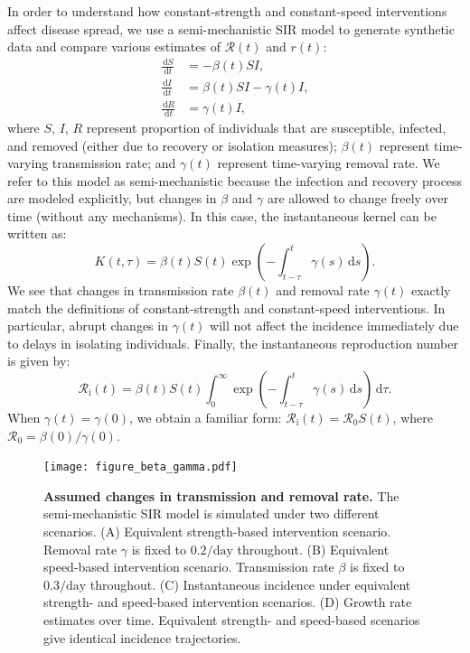 \documentclass[12pt]{article}
\newcommand{\pday}{\ensuremath{/\textrm{day}}}
\newcommand{\Rx}[1]{\ensuremath{{\mathcal R}_{#1}}\xspace}
\newcommand{\Ro}{\Rx{0}}
\newcommand{\Ri}{\Rx{\mathrm{i}}}
\newcommand{\RR}{\ensuremath{{\mathcal R}}\xspace}
\newcommand{\dd}[1]{\ensuremath{\, \mathrm{d}#1}}
\newcommand{\dtau}{\dd{\tau}}
\begin{document}
In order to understand how constant-strength and constant-speed interventions affect disease spread, we use a semi-mechanistic SIR model to generate synthetic data and compare various estimates of $\RR(t)$ and $r(t)$:
\begin{align}
\frac{\dd{S}}{\dd{t}} &= - \beta(t)S I, \label{eq:dSdt}\\
\frac{\dd{I}}{\dd{t}} &= \beta(t)S I - \gamma(t) I,\\
\frac{\dd{R}}{\dd{t}} &= \gamma(t) I,  \label{eq:dRdt}
\end{align}
where $S$, $I$, $R$ represent proportion of individuals that are susceptible, infected, and removed (either due to recovery or isolation measures);
$\beta(t)$ represent time-varying transmission rate; and $\gamma(t)$ represent time-varying removal rate.
We refer to this model as semi-mechanistic because the infection and recovery process are modeled explicitly, but changes in $\beta$ and $\gamma$ are allowed to change freely over time (without any mechanisms).
In this case, the instantaneous kernel can be written as:
\begin{equation}
K(t, \tau) = \beta(t) S(t) \exp\left(-\int_{t-\tau}^t \gamma(s) \dd{s} \right).
\end{equation}
We see that changes in transmission rate $\beta(t)$ and removal rate $\gamma(t)$ exactly match the definitions of constant-strength and constant-speed interventions.
In particular, abrupt changes in $\gamma(t)$ will not affect the incidence immediately due to delays in isolating individuals.
Finally, the instantaneous reproduction number is given by:
\begin{equation}
\Ri(t) = \beta(t) S(t) \int_0^\infty \exp\left(-\int_{t-\tau}^t \gamma(s) \dd{s} \right) \dtau.
\end{equation}
When $\gamma(t) = \gamma(0)$, we obtain a familiar form: $\Ri(t) = \Ro S(t)$,
where $\Ro = \beta(0)/\gamma(0)$.

\begin{figure}[!ht]
\texttt{[image: figure\_beta\_gamma.pdf]}
\caption{
\textbf{Assumed changes in transmission and removal rate.}
The semi-mechanistic SIR model is simulated under two different scenarios.
(A) Equivalent strength-based intervention scenario.
Removal rate $\gamma$ is fixed to $0.2\pday$ throughout.
(B) Equivalent speed-based intervention scenario.
Transmission rate $\beta$ is fixed to $0.3\pday$ throughout.
(C) Instantaneous incidence under equivalent strength- and speed-based intervention scenarios.
(D) Growth rate estimates over time.
Equivalent strength- and speed-based scenarios give identical incidence trajectories.
}
\label{fig:assumption}
\end{figure}
\end{document}
